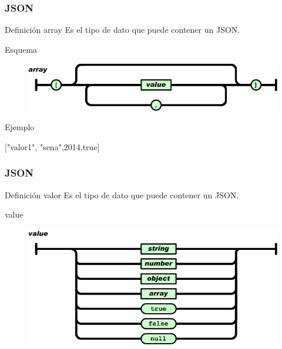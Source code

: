 \documentclass{beamer}
\begin{document}
\begin{frame}
\frametitle{JSON}
\begin{block}{Definici\'on array}
 Es el tipo de dato que puede contener un JSON.
\end{block}

\begin{block}{Esquema}
\begin{figure}
\includegraphics[width=0.7\linewidth]{array.png}
\end{figure}
\end{block}

\begin{block}{Ejemplo}
\begin{center}
["valor1", "sena",2014,true]
\end{center}
\end{block}

\end{frame}


\begin{frame}
\frametitle{JSON}
\begin{block}{Definici\'on valor}
 Es el tipo de dato que puede contener un JSON.
\end{block}

\begin{block}{value}
\begin{figure}
\includegraphics[width=0.7\linewidth]{value.png}
\end{figure}
\end{block}

\end{frame}

\end{document}
